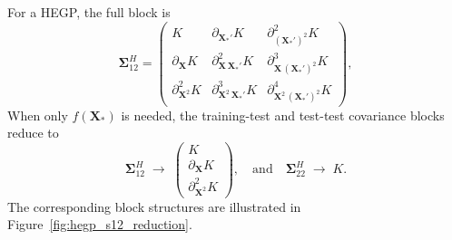 \documentclass[12pt]{article}
\begin{document}
For a HEGP, the full block is
\begin{equation}
	\boldsymbol{\Sigma}_{12}^{H} =
	\begin{pmatrix}
		K & \partial_{\mathbf{X}_*'} K & \partial^2_{(\mathbf{X}_*')^2} K \\
		\partial_{\mathbf{X}} K & \partial^2_{\mathbf{X}\,\mathbf{X}_*'} K & \partial^3_{\mathbf{X}\,(\mathbf{X}_*')^2} K \\
		\partial^2_{\mathbf{X}^2} K & \partial^3_{\mathbf{X}^2\,\mathbf{X}_*'} K & \partial^4_{\mathbf{X}^2\,(\mathbf{X}_*')^2} K
	\end{pmatrix},
\end{equation}
When only $f(\mathbf{X}_*)$ is needed, the training-test and test-test covariance blocks reduce to
\begin{equation}
	\boldsymbol{\Sigma}_{12}^{H} \;\longrightarrow\;
	\begin{pmatrix}
		K \\
		\partial_{\mathbf{X}} K \\
		\partial^2_{\mathbf{X}^2} K
	\end{pmatrix}, \quad \text{and} \quad
	\boldsymbol{\Sigma}_{22}^{H} \;\longrightarrow\; K.
\end{equation}
The corresponding block structures are illustrated in Figure~\ref{fig:hegp_s12_reduction}.
\end{document}
